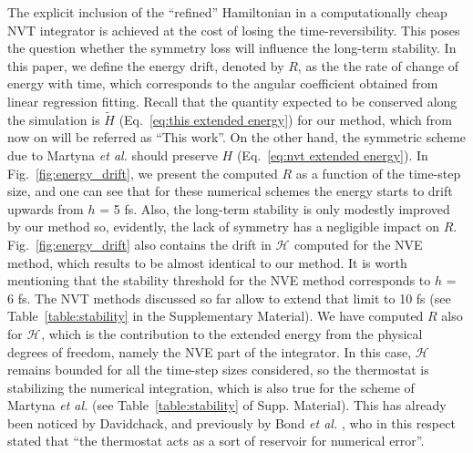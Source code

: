 \documentclass[
journal=jctcce,
layout=twocolumn
]{achemso}
\newcommand{\Ham}[1]{{\mathcal H}_\text{#1}}    %
\begin{document}
The explicit inclusion of the ``refined'' Hamiltonian in a computationally cheap NVT integrator is achieved at the cost of losing the time-reversibility.
This poses the question whether the symmetry loss will influence the long-term stability.
In this paper, we define the energy drift, denoted by $R$, as the the rate of change of energy with time, which corresponds to the angular coefficient obtained from linear regression fitting.
Recall that the quantity expected to be conserved along the simulation is $\widetilde{H}$ (Eq.~\ref{eq:this extended energy}) for our method, which from now on will be referred as ``This work''.
On the other hand, the symmetric scheme due to Martyna \textit{et al.} \cite{Martyna_1996} should preserve $H$ (Eq.~\ref{eq:nvt extended energy}).
In Fig.~\ref{fig:energy_drift}, we present the computed $R$ as a function of the time-step size, and one can see that for these numerical schemes the energy starts to drift upwards from $h$ = 5 fs. 
Also, the long-term stability is only modestly improved by our method so, evidently, the lack of symmetry has a negligible impact on $R$.
Fig.~\ref{fig:energy_drift} also contains the drift in $\Ham{}$ computed for the NVE method\cite{Silveira_2017}, which results to be almost identical to our method.
It is worth mentioning that the stability threshold for the NVE method corresponds to $h$ = 6 fs.
The NVT methods discussed so far allow to extend that limit to 10 fs (see Table~\ref{table:stability} in the Supplementary Material).
We have computed $R$ also for $\Ham{}$, which is the contribution to the extended energy from the physical degrees of freedom, namely the NVE part of the integrator.
In this case, $\Ham{}$ remains bounded for all the time-step sizes considered, so the thermostat is stabilizing the numerical integration, which is also true for the scheme of Martyna \textit{et al.} \cite{Martyna_1996} (see Table~\ref{table:stability} of Supp. Material).
This has already been noticed by Davidchack\cite{Davidchack_2009}, and previously by Bond \textit{et al.} \cite{Bond_2007}, who in this respect stated that ``the thermostat acts as a sort of reservoir for numerical error''.
\end{document}
